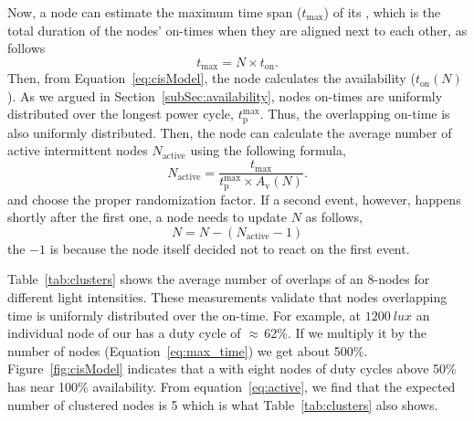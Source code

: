 Now, a node can estimate the maximum time span ($t_\text{max}$) of its \sys, which is the total duration of the nodes' on-times when they are aligned next to each other, as follows
\begin{equation}
t_\text{max} = N\times t_\text{on}.
		\label{eq:max_time}
\end{equation}
Then, from Equation~\ref{eq:cisModel}, the node calculates the \sys availability ($t_\text{on}(N)$). As we argued in Section~\ref{subSec:availability}, nodes on-times are uniformly distributed over the longest power cycle, $t_\text{p}^\text{max}$. Thus, the overlapping on-time is also uniformly distributed. Then, the node can calculate the average number of active intermittent nodes $N_\text{active}$ using the following formula,
\begin{equation}
	N_\text{active} = \frac{t_\text{max}}{t_\text{p}^\text{max}\times A_\text{v}(N)}.
	\label{eq:active}
\end{equation}
and choose the proper randomization factor. If a second event, however, happens shortly after the first one, a node needs to update $N$ as follows, 
$$
N = N - (N_\text{active}-1)
$$
the $-1$ is because the node itself decided not to react on the first event. 

Table~\ref{tab:clusters} shows the average number of overlaps of an 8-nodes \sys for different light intensities. These measurements validate that nodes overlapping time is uniformly distributed over the \sys on-time. For example, at $\SI{1200}{lux}$ an individual node of our \sys has a duty cycle of $\approx$\,62\%. If we multiply it by the number of nodes (Equation~\ref{eq:max_time}) we get about 500\%. Figure~\ref{fig:cisModel} indicates that a \sys with eight nodes of duty cycles above 50\% has near 100\% availability. From equation~\ref{eq:active}, we find that the expected number of clustered nodes is 5 which is what Table~\ref{tab:clusters} also shows. 








































